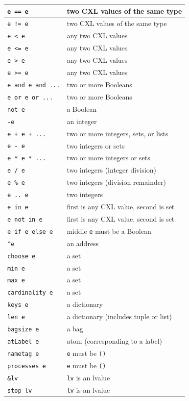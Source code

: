 \documentclass{report}
\begin{document}
\vspace{1em}
\begin{tabular}{|l|l|}
\hline
\texttt{e == e} & two CXL values of the same type \\
\hline
\texttt{e != e} & two CXL values of the same type \\
\hline
\texttt{e < e} & any two CXL values \\
\hline
\texttt{e <= e} & any two CXL values \\
\hline
\texttt{e > e} & any two CXL values \\
\hline
\texttt{e >= e} & any two CXL values \\
\hline
\texttt{e and e and ...} & two or more Booleans \\
\hline
\texttt{e or e or ...} & two or more Booleans \\
\hline
\texttt{not e} & a Boolean \\
\hline
\texttt{-e} & an integer \\
\hline
\texttt{e + e + ...} & two or more integers, sets, or lists \\
\hline
\texttt{e - e} & two integers or sets \\
\hline
\texttt{e * e * ...} & two or more integers or sets \\
\hline
\texttt{e / e} & two integers (integer division) \\
\hline
\texttt{e \% e} & two integers (division remainder) \\
\hline
\texttt{e~..~e} & two integers \\
\hline
\texttt{e in e} & first is any CXL value, second is set \\
\hline
\texttt{e not in e} & first is any CXL value, second is set \\
\hline
\texttt{e if e else e} & middle \texttt{e} must be a Boolean \\
\hline
\texttt{\^{}e} & an address \\
\hline
\texttt{choose e} & a set \\
\hline
\texttt{min e} & a set \\
\hline
\texttt{max e} & a set \\
\hline
\texttt{cardinality e} & a set \\
\hline
\texttt{keys e} & a dictionary \\
\hline
\texttt{len e} & a dictionary (includes tuple or list) \\
\hline
\texttt{bagsize e} & a bag \\
\hline
\texttt{atLabel e} & atom (corresponding to a label) \\
\hline
\texttt{nametag e} & \texttt{e} must be \texttt{()} \\
\hline
\texttt{processes e} & \texttt{e} must be \texttt{()} \\
\hline
\texttt{\&lv} & \texttt{lv} is an lvalue \\
\hline
\texttt{stop lv} & \texttt{lv} is an lvalue \\
\hline
\end{tabular}
\vspace{1em}
\end{document}
